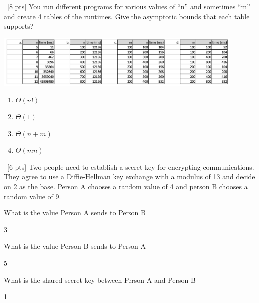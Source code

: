 \documentclass[12pt]{article}
\newenvironment{sol}[1][Solution]{\begin{trivlist}\item[\hskip\labelsep {\bfseries #1:}]}{\end{trivlist}}
\begin{document}
\begin{enumerate}
\begin{enumerate}
\end{enumerate}

\item \ [8 pts] You run different programs for various values of “n” and sometimes “m” and create 4 tables of the runtimes. Give the asymptotic bounds that each table supports?
    \begin{center}
    \includegraphics[width=0.9\textwidth]{p5.png}
    \end{center} 
    \begin{sol}
    \hspace*{\fill}
        \begin{enumerate}
            \item $\Theta(n!)$
            \item $\Theta(1)$
            \item $\Theta(n+m)$
            \item $\Theta(mn)$
        \end{enumerate}
    \end{sol}


    \item \ [6 pts] Two people need to establish a secret key for encrypting communications. They agree to use a Diffie-Hellman key exchange with a modulus of 13 and decide on 2 as the base. Person A chooses a random value of 4 and person B chooses a random value of 9.
    \begin{enumerate}
        \item What is the value Person A sends to Person B
        \begin{sol}
            3
        \end{sol}
        \item What is the value Person B sends to Person A
        \begin{sol}
            5
        \end{sol}
        \item What is the shared secret key between Person A and Person B
        \begin{sol}
            1
        \end{sol}


\end{enumerate}
\end{enumerate}
\end{document}
